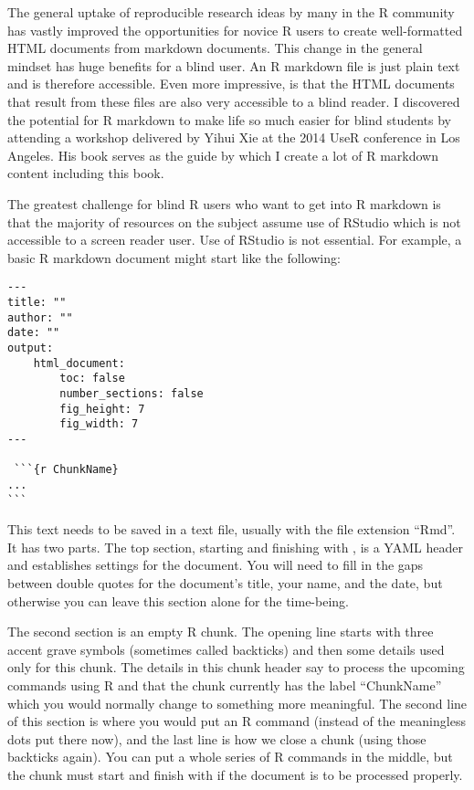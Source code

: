 \documentclass[
]{book}
\begin{document}
The general uptake of reproducible research ideas by many in the R community has vastly improved the opportunities for novice R users to create well-formatted HTML documents from markdown documents.
This change in the general mindset has huge benefits for a blind user.
An R markdown file is just plain text and is therefore accessible.
Even more impressive, is that the HTML documents that result from these files are also very accessible to a blind reader. I discovered the potential for R markdown to make life so much easier for blind students by attending a workshop delivered by Yihui Xie at the 2014 UseR conference in Los Angeles. His book \citep{Xie2015} serves as the guide by which I create a lot of R markdown content including this book.

The greatest challenge for blind R users who want to get into R markdown is that the majority of resources on the subject assume use of RStudio \citep{RStudio} which is not accessible to a screen reader user. Use of RStudio is not essential. For example, a basic R markdown document might start like the following:

\begin{verbatim}
---
title: ""
author: ""
date: ""
output:
    html_document:
        toc: false
        number_sections: false
        fig_height: 7
        fig_width: 7
--- 

 ```{r ChunkName}
...
```
\end{verbatim}

This text needs to be saved in a text file, usually with the file extension ``Rmd''. It has two parts. The top section, starting and finishing with , is a YAML header and establishes settings for the document. You will need to fill in the gaps between double quotes for the document's title, your name, and the date, but otherwise you can leave this section alone for the time-being.

The second section is an empty R chunk. The opening line starts with three accent grave symbols (sometimes called backticks) and then some details used only for this chunk. The details in this chunk header say to process the upcoming commands using R and that the chunk currently has the label ``ChunkName'' which you would normally change to something more meaningful. The second line of this section is where you would put an R command (instead of the meaningless dots put there now), and the last line is how we close a chunk (using those backticks again). You can put a whole series of R commands in the middle, but the chunk must start and finish with \texttt{\textasciigrave{}\textasciigrave{}\textasciigrave{}} if the document is to be processed properly.
\end{document}
